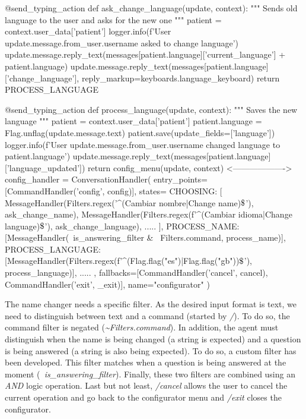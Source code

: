 \documentclass[12pt,english]{article}
\newcommand{\dollar}{\mbox{\textdollar}}
\begin{document}
\begin{python}[caption={Name changer configurator callbacks}, captionpos=b]
  @send_typing_action
  def ask_change_language(update, context):
      """
      Sends old language to the user and asks for the new one
      """
      patient = context.user_data['patient']
      logger.info(f'User {update.message.from_user.username} asked to change language')
      update.message.reply_text(messages[patient.language]['current_language'] + patient.language)
      update.message.reply_text(messages[patient.language]['change_language'], reply_markup=keyboards.language_keyboard)
      return PROCESS_LANGUAGE

  @send_typing_action
  def process_language(update, context):
      """
      Saves the new language
      """
      patient = context.user_data['patient']
      patient.language = Flag.unflag(update.message.text)
      patient.save(update_fields=['language'])
      logger.info(f'User {update.message.from_user.username} changed language to {patient.language}')
      update.message.reply_text(messages[patient.language]['language_updated'])
      return config_menu(update, context)
  <------------------->
  config_handler = ConversationHandler(
      entry_points=[CommandHandler('config', config)],
      states={
          CHOOSING: [
                     MessageHandler(Filters.regex('^(Cambiar nombre|Change name)$\dollar$'), ask_change_name),
                     MessageHandler(Filters.regex(f'^(Cambiar idioma|Change language)$\dollar$'), ask_change_language),
                     .....
                     ],
          PROCESS_NAME: [MessageHandler(~is_answering_filter & ~Filters.command, process_name)],
          PROCESS_LANGUAGE: [MessageHandler(Filters.regex(f'^({Flag.flag("es")}|{Flag.flag("gb")})$\dollar$'),
                                            process_language)],
          .....
      },
      fallbacks=[CommandHandler('cancel', cancel),
                 CommandHandler('exit', _exit)],
      name="configurator"
  )

\end{python}

The name changer needs a specific filter. As the desired input format is text, we need to distinguish between text and a command (started by \emph{/}). To do so, the command filter is negated (\emph{\~{}Filters.command}). In addition, the agent must distinguish when the name is being changed (a string is expected) and a question is being answered (a string is also being expected). To do so, a custom filter has been developed. This filter matches when a question is being answered at the moment (\emph{~is\_answering\_filter}). Finally, these two filters are combined using an \emph{AND} logic operation. Last but not least, \emph{/cancel} allows the user to cancel the current operation and go back to the configurator menu and \emph{/exit} closes the configurator.
\end{document}

